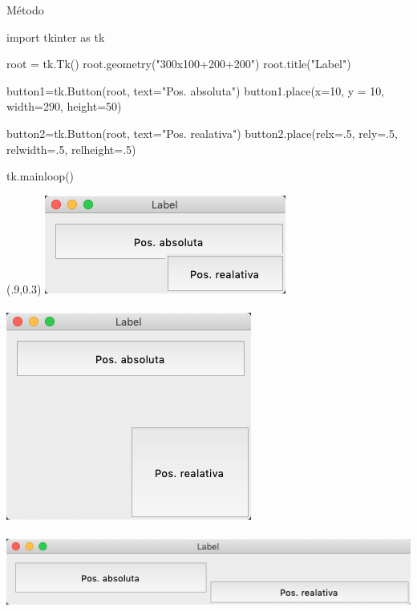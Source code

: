 \documentclass[10pt, envcountsect , spanish]{beamer}
\begin{document}
\begin{frame}[fragile, label=place]{Método }

\small
\begin{pyverbatim}[][frame=single]
import tkinter as tk

root = tk.Tk()
root.geometry("300x100+200+200")
root.title("Label")


button1=tk.Button(root, text="Pos. absoluta")
button1.place(x=10, y = 10, width=290, height=50)

button2=tk.Button(root, text="Pos. realativa")
button2.place(relx=.5, rely=.5, 
                       relwidth=.5, relheight=.5)

tk.mainloop()
\end{pyverbatim}



\begin{textblock*}{.25\textwidth}(.9\textwidth,0.3\textheight)
\includegraphics[width=\textwidth]{fig/place1}\\
\; \\
\includegraphics[width=\textwidth]{fig/place2}\\
\; \\
\includegraphics[width=\textwidth]{fig/place3}
\end{textblock*}
\end{frame}
\end{document}
